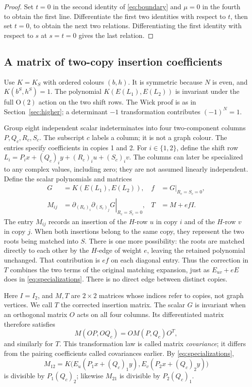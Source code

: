 \documentclass[11pt]{article}
\theoremstyle{definition}
\theoremstyle{plain}
\numberwithin{equation}{section}
\begin{document}
\begin{proof}
Set \(t=0\) in the second identity of \eqref{eq:boundary} and
\(\mu=0\) in the fourth to obtain the first line. Differentiate the
first two identities with respect to \(t\), then set \(t=0\), to obtain
the next two relations. Differentiating the first identity with respect
to \(s\) at \(s=t=0\) gives the last relation.
\end{proof}

\subsection{A matrix of two-copy insertion coefficients}

Use \(K=K_S\) with ordered colours \((b,h)\). It is symmetric because
\(N\) is even, and \(K(b^S,h^S)=1\). The polynomial
\(K(E(L_1),E(L_2))\) is invariant under the full \(\mathrm O(2)\) action
on the two shift rows. The Wick proof is as in Section~\ref{sec:higher}; a
determinant \(-1\) transformation contributes \((-1)^N=1\).

Group eight independent scalar indeterminates into four two-component
columns \(P,Q_c,R_c,S_c\). The subscript \(c\) labels a column; it is
not a graph colour. The entries specify coefficients in copies 1 and 2.
For \(i\in\{1,2\}\), define the shift row
\(L_i=P_i x+(Q_c)_iy+(R_c)_iu+(S_c)_iv\). The columns can later be
specialized to any complex values, including zero; they are not assumed
linearly independent. Define the scalar polynomials and matrices
\[
 \begin{aligned}
 G&=K(E(L_1),E(L_2)),& f&=G\big|_{R_c=S_c=0},\\
 M_{ij}&=\left.\partial_{(R_c)_i}\partial_{(S_c)_j}G\right|_{R_c=S_c=0},
 &T&=M+efI.
 \end{aligned}
\]
The entry \(M_{ij}\) records an insertion of the \(H\)-row \(u\) in
copy \(i\) and of the \(H\)-row \(v\) in copy \(j\). When both insertions
belong to the same copy, they represent the two roots being matched into
\(S\). There is one more possibility: the roots are matched directly to
each other by the \(H\)-edge of weight \(e\), leaving the retained
polynomial unchanged. That contribution is \(ef\) on each diagonal entry.
Thus the correction in \(T\) combines the two terms of the original
matching expansion, just as \(E_{uv}+eE\) does in
\eqref{eq:specializations}. There is no direct edge between distinct copies.

Here \(I=I_2\), and \(M,T\) are \(2\times2\) matrices whose indices
refer to copies, not graph vertices. We call \(T\) the corrected insertion
matrix. The scalar \(G\) is invariant when an orthogonal matrix \(O\)
acts on all four columns. Its differentiated matrix therefore satisfies
\[
 M(OP,OQ_c)=O M(P,Q_c)O^T,
\]
and similarly for \(T\). This transformation law is called matrix
\emph{covariance}; it differs from the pairing coefficients called
covariances earlier. By \eqref{eq:specializations},
\[
 M_{12}=K\bigl(E_u(P_1x+(Q_c)_1y),E_v(P_2x+(Q_c)_2y)\bigr)
\]
is divisible by \(P_1(Q_c)_2\); likewise \(M_{21}\) is divisible by
\(P_2(Q_c)_1\).
\end{document}
